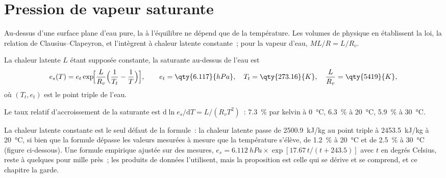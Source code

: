 \section{Pression de vapeur saturante}\label{sec:b2:atmospheric-thermodynamics:saturation}

Au-dessus d'une surface plane d'eau pure, la  à l'équilibre ne dépend que
de la température. Les volumes de physique en établissent la loi, la relation de Clausius--Clapeyron,
et l'intègrent à chaleur latente constante~; pour la vapeur d'eau, $M L/R = L/R_v$.

\begin{proposition}\label{prop:b2:atmospheric-thermodynamics:es}
La chaleur latente $L$ étant supposée constante, la  saturante au-dessus de l'eau est
\[
  e_s(T) = e_t \exp\!\Bigl[\frac{L}{R_v}\Bigl(\frac{1}{T_t} - \frac{1}{T}\Bigr)\Bigr],
  \qquad e_t = \qty{6.117}{hPa}, \quad T_t = \qty{273.16}{K}, \quad \frac{L}{R_v} =
  \qty{5419}{K},
\]
où $(T_t, e_t)$ est le point triple de l'eau.
\end{proposition}

\begin{corollary}\label{cor:b2:atmospheric-thermodynamics:seven}
Le taux relatif d'accroissement de la  saturante
est $\mathrm{d}\ln e_s/\mathrm{d}T = L/(R_v T^2)$~:
\qty{7.3}{\percent} par kelvin à \qty{0}{\celsius}, \qty{6.3}{\percent}
à \qty{20}{\celsius}, \qty{5.9}{\percent} à \qty{30}{\celsius}.
\end{corollary}

La chaleur latente constante est le seul défaut de la formule~: la chaleur latente passe de
\qty{2500.9}{kJ/kg} au point triple à \qty{2453.5}{kJ/kg} à \qty{20}{\celsius}, si bien que la
formule dépasse les valeurs mesurées à mesure que la température s'élève, de \qty{1.2}{\percent} à
\qty{20}{\celsius} et de \qty{2.5}{\percent} à \qty{30}{\celsius} (figure ci-dessous). Une
formule empirique ajustée sur des mesures, $e_s = \qty{6.112}{hPa} \times \exp[17.67\,t/(t + 243.5)]$
avec $t$ en degrés Celsius, reste à quelques pour mille près~; les produits de données
l'utilisent, mais la proposition est celle qui se dérive et se comprend, et ce chapitre la garde.

